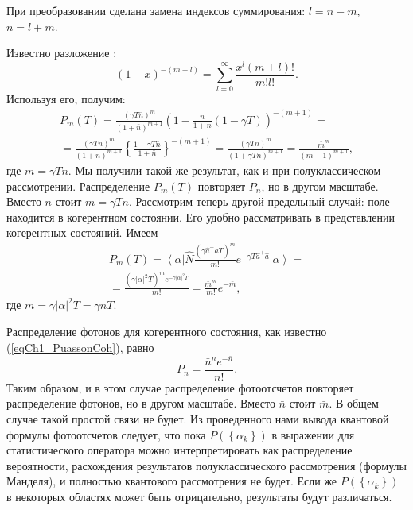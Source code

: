 При преобразовании сделана замена индексов суммирования: $l = n - m$,
$n = l + m$.

Известно разложение \cite{bDvait1973}:
\[
\left(1 - x\right)^{-\left(m + l\right)} = 
\sum_{l = 0}^\infty
\frac{x^l \left(m + l\right)!}{m! l!}.
\]
Используя его, получим:
\begin{eqnarray}
P_m\left(T\right) = 
\frac{\left(\gamma T \bar{n}\right)^m}{\left(1 + \bar{n}\right)^{m +
    1}}
\left(
1 - \frac{\bar{n}}{1 + \bar{n}}\left(1 - \gamma T\right)
\right)^{-\left(m + 1\right)} = 
\nonumber \\
=
\frac{\left(\gamma T \bar{n}\right)^m}{\left(1 + \bar{n}\right)^{m +
    1}} 
\left\{
\frac{1 - \gamma T \bar{n}}{1 + \bar{n}} 
\right\}^{-\left(m + 1\right)} = 
\frac{\left(\gamma T \bar{n}\right)^m}{\left(1 + \gamma T \bar{n}\right)^{m +
    1}} =
\frac{\bar{m}^m}{\left(\bar{m} + 1\right)^{m + 1}},
\label{eqCh4_66}
\end{eqnarray}
где $\bar{m} = \gamma T \bar{n}$.  Мы получили такой же результат, как
и при полуклассическом 
рассмотрении. Распределение $P_m\left(T\right)$ повторяет $P_n$,  но в
другом 
масштабе. Вместо $\bar{n}$ стоит $\bar{m} = \gamma T
\bar{n}$. Рассмотрим теперь другой предельный случай: поле находится в
когерентном состоянии. Его удобно рассматривать в представлении
когерентных состояний. Имеем  
\begin{eqnarray}
P_m\left(T\right) = 
\left<\alpha\right|
\hat{N}
\frac{\left(\gamma \hat{a}^{+} \hat{a} T\right)^m}{m!}
e^{- \gamma T \hat{a}^{+} \hat{a}}
\left|\alpha\right> = 
\nonumber \\
=
\frac{\left(\gamma \left|\alpha\right|^2 T\right)^m e^{-\gamma
    \left|\alpha\right|^2 T}}{m!} = 
\frac{\bar{m}^m}{m!}e^{-\bar{m}},
\label{eqCh4_67}
\end{eqnarray}
где $\bar{m} = \gamma \left|\alpha\right|^2 T = \gamma \bar{n} T$.

Распределение фотонов для когерентного состояния, как известно
(\ref{eqCh1_PuassonCoh}), 
равно  
\[
P_n = \frac{\bar{n}^n e^{-\bar{n}}}{n!}.
\]
Таким образом, и в этом случае распределение фотоотсчетов
повторяет распределение фотонов, но в другом масштабе. Вместо
$\bar{n}$ стоит $\bar{m}$.  В общем случае  такой простой связи не
будет. Из проведенного нами вывода квантовой формулы фотоотсчетов
следует, что пока $P\left(\left\{\alpha_k\right\}\right)$ в выражении 
для статистического оператора можно интерпретировать как распределение
вероятности, расхождения результатов полуклассического рассмотрения
(формулы Манделя), и полностью квантового рассмотрения не будет. Если
же $P\left(\left\{\alpha_k\right\}\right)$ в некоторых областях может
быть отрицательно, результаты будут различаться.  
